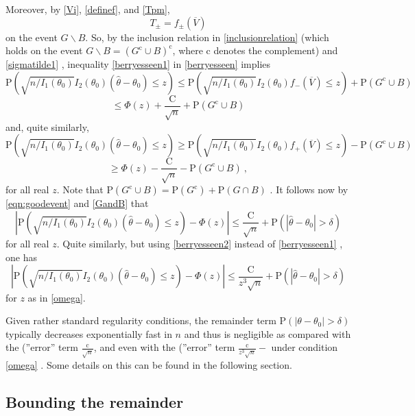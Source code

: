 Moreover, by \eqref{Vi}, \eqref{definef}, and \eqref{Tpm},
$$
T_{\pm}=f_{\pm}(\overline{V})
$$
on the event $G\backslash B$. So, by the inclusion relation in \eqref{inclusionrelation} (which holds on the event $G\backslash B=(G^{\mathrm{c}}\cup B)^{\mathrm{c}}$, where $\mathrm{c}$ denotes the complement) and \eqref{sigmatilde1} , inequality \eqref{berryesseen1} in \ref{berryesseen} implies
$$
\mathrm{P}(\sqrt{n/I_1(\theta_{0})}I_2(\theta_0)(\hat{\theta}-\theta_{0})\leq z)\leq \mathrm{P}(\sqrt{n/I_1(\theta_{0})}I_2(\theta_0)f_{-}(\overline{V})\leq z)+\mathrm{P}(G^{\mathrm{c}}\cup B)
$$
$$
\leq\Phi(z)+\frac{\mathrm{C}}{\sqrt{n}}+\mathrm{P}(G^{\mathrm{c}}\cup B)
$$
and, quite similarly,
$$
\mathrm{P}(\sqrt{n/I_1(\theta_{0})}I_2(\theta_0)(\hat{\theta}-\theta_{0})\leq z)\geq \mathrm{P}(\sqrt{n/I_1(\theta_{0})}I_2(\theta_0)f_{+}(\overline{V})\leq z)-\mathrm{P}(G^{\mathrm{c}}\cup B)
$$
$$
\geq\Phi(z)-\frac{\mathrm{C}}{\sqrt{n}}-\mathrm{P}(G^{\mathrm{c}}\cup B)\ ,
$$
for all real $z$. Note that $\mathrm{P}(G^{\mathrm{c}}\cup B)=\mathrm{P}(G^{\mathrm{c}})+\mathrm{P}(G\cap B)$ . It follows now by \eqref{eqn:goodevent} and \eqref{GandB} that
\begin{equation}
	|\displaystyle \mathrm{P}(\sqrt{n/I_1(\theta_{0})}I_2(\theta_0)(\hat{\theta}-\theta_{0})\leq z)-\Phi(z)|\leq\frac{\mathrm{C}}{\sqrt{n}}+\mathrm{P}(|\hat{\theta}-\theta_{0}|>\delta)
\end{equation}
for all real $z$. Quite similarly, but using \eqref{berryesseen2} instead of \eqref{berryesseen1} , one has
\begin{equation}
	|\displaystyle \mathrm{P}(\sqrt{n/I_1(\theta_{0})}I_2(\theta_0)(\hat{\theta}-\theta_{0})\leq z)-\Phi(z)|\leq\frac{\mathrm{C}}{z^{3}\sqrt{n}}+\mathrm{P}(|\hat{\theta}-\theta_{0}|>\delta)
\end{equation}
for $z$ as in \eqref{omega}.

Given rather standard regularity conditions, the remainder term $\mathrm{P}(|\theta-\theta_{0}|>\delta)$ typically decreases exponentially fast in $n$ and thus is negligible as compared with the (''error'' term $\displaystyle \frac{\mathrm{c}}{\sqrt{n}}$, and even with the (''error'' term $\displaystyle \frac{\mathrm{c}}{z^{3}\sqrt{n}}-$ under condition \eqref{omega} . Some details on this can be found in the following section.

\subsection*{Bounding the remainder}

